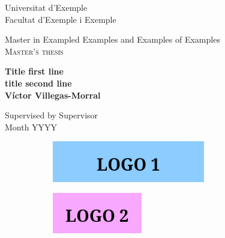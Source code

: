 \thispagestyle{empty}

\begin{titlepage}
    \begin{center}
        \Large Universitat d'Exemple\\[0.2em]
        \LARGE Facultat d'Exemple i Exemple
    \end{center}
    \vspace{3cm}
    \begin{center}
        \large Master in Exampled Examples and Examples of Examples\\[0.2em]
        \LARGE\scshape Master's thesis
    \end{center}
    \vspace{1cm}
    \begin{center}
        {\color{RoyalBlue}\Huge\bf Title first line\\[0.5em]
        title second line}\\[1.5em]
        {\LARGE\bf Víctor Villegas-Morral}
    \end{center}
    \vspace{3cm}
    \begin{center}
        \Large Supervised by Supervisor \\[0.5em]
        \large Month YYYY
    \end{center}
    \begin{figure}[b]
        \centering
        \begin{subfigure}{0.62\textwidth}
            \centering
            \includegraphics[height=4.8em]{figures/cover-logo-1.jpeg}
        \end{subfigure}
        \hfill
        \begin{subfigure}{0.36\textwidth}
            \centering
            \includegraphics[height=4.8em]{figures/cover-logo-2.jpeg}
        \end{subfigure}
    \end{figure}
    \restoregeometry
\end{titlepage}